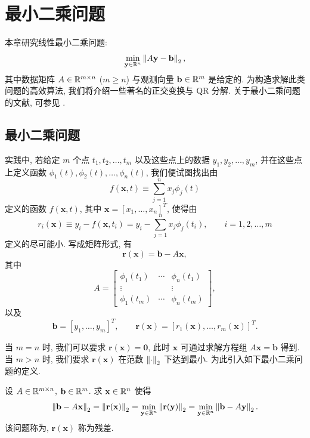\chapter{最小二乘问题}
\label{ch:leastsquares}

本章研究线性最小二乘问题:
\[
  \min_{\mathbf{y}\in\mathbb{R}^n}\left\|A\mathbf{y}-\mathbf{b}\right\|_2,
\]
其中数据矩阵 $A\in\mathbb{R}^{m\times n}$ ($m\geqslant n$) 与观测向量 $\mathbf{b}\in\mathbb{R}^m$ 是给定的. 为构造求解此类问题的高效算法, 我们将介绍一些著名的正交变换与 QR 分解. 关于最小二乘问题的文献, 可参见 \cite{src:9,src:11,src:28,src:36,src:88,src:92,src:93,src:94}.

\section{最小二乘问题}
\label{sec:4-1}

实践中, 若给定 $m$ 个点 $t_1,t_2,\ldots,t_m$ 以及这些点上的数据 $y_1,y_2,\ldots,y_m$, 并在这些点上定义函数 $\phi_1(t),\phi_2(t),\ldots,\phi_n(t)$, 我们便试图找出由
\[
  f(\mathbf{x},t)\equiv\sum_{j=1}^{n}x_j\phi_j(t)
\]
定义的函数 $f(\mathbf{x},t)$, 其中 $\mathbf{x}=[x_1,\ldots,x_n]^T$, 使得由
\[
  r_i(\mathbf{x})\equiv y_i-f(\mathbf{x},t_i)
  =y_i-\sum_{j=1}^{n}x_j\phi_j(t_i),
  \qquad i=1,2,\ldots,m
\]
定义的尽可能小. 写成矩阵形式, 有
\[
  \mathbf{r}(\mathbf{x})=\mathbf{b}-A\mathbf{x},
\]
其中
\[
  A=
  \begin{bmatrix}
    \phi_1(t_1) & \cdots & \phi_n(t_1)\\
    \vdots      &        & \vdots\\
    \phi_1(t_m) & \cdots & \phi_n(t_m)
  \end{bmatrix},
\]
以及
\[
  \mathbf{b}=[y_1,\ldots,y_m]^T,\qquad
  \mathbf{r}(\mathbf{x})=[r_1(\mathbf{x}),\ldots,r_m(\mathbf{x})]^T.
\]

当 $m=n$ 时, 我们可以要求 $\mathbf{r}(\mathbf{x})=\mathbf{0}$, 此时 $\mathbf{x}$ 可通过求解方程组 $A\mathbf{x}=\mathbf{b}$ 得到. 当 $m>n$ 时, 我们要求 $\mathbf{r}(\mathbf{x})$ 在范数 $\left\|\cdot\right\|_2$ 下达到最小. 为此引入如下最小二乘问题的定义.

\begin{definition}
\label{def:4-1}
设 $A\in\mathbb{R}^{m\times n}$, $\mathbf{b}\in\mathbb{R}^m$. 求 $\mathbf{x}\in\mathbb{R}^n$ 使得
\begin{equation}
  \left\|\mathbf{b}-A\mathbf{x}\right\|_2=\left\|\mathbf{r}(\mathbf{x})\right\|_2
  =\min_{\mathbf{y}\in\mathbb{R}^n}\left\|\mathbf{r}(\mathbf{y})\right\|_2
  =\min_{\mathbf{y}\in\mathbb{R}^n}\left\|\mathbf{b}-A\mathbf{y}\right\|_2.
  \label{eq:4-1}
\end{equation}
该问题称为, $\mathbf{r}(\mathbf{x})$ 称为残差.
\end{definition}


